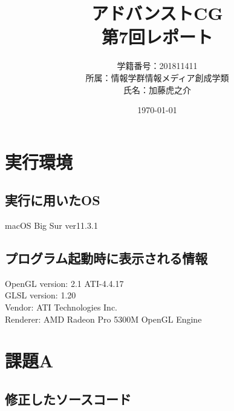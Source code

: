 \documentclass[a4paper,10pt,uplatex,dvipdfmx]{jsarticle}
\begin{document}
\title{アドバンストCG\\ \huge 第7回レポート}
\author{学籍番号：201811411\\ 所属：情報学群情報メディア創成学類\\ 氏名：加藤虎之介}
\date{\today}
\maketitle

\section{実行環境}
\subsection{実行に用いたOS}
macOS Big Sur ver11.3.1

\subsection{プログラム起動時に表示される情報}
\begin{screen}
	OpenGL version: 2.1 ATI-4.4.17\\
	GLSL version: 1.20\\
	Vendor: ATI Technologies Inc.\\
	Renderer: AMD Radeon Pro 5300M OpenGL Engine
\end{screen}

\section{課題A}
\subsection{修正したソースコード}
\end{document}
